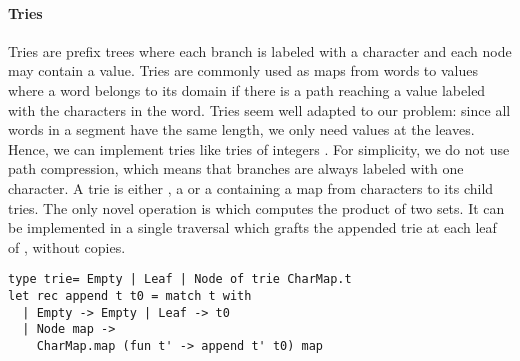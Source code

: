 \paragraph{Tries}

Tries \cite{Fredkin1960} are prefix trees where each branch is labeled
with a character and each node may contain a value. Tries are commonly used
as maps from words to values where a word belongs to its domain if there is a
path reaching a value labeled with the characters in the word.
Tries seem well adapted to our problem:
since all words in a segment have the same length, we only need values at the leaves.
%
Hence, we can implement tries like tries of integers \cite{Okasaki98fastmergeable}.
For simplicity, we do not use path compression, which means
that branches are always labeled with one character.
A trie is either , a  or a  containing a map from characters
to its child tries.
%
The only novel operation is  which computes the product of two sets.
It can be implemented in a single traversal which grafts the
appended trie  at each leaf of , without copies.
%
\begin{lstlisting}
type trie= Empty | Leaf | Node of trie CharMap.t
let rec append t t0 = match t with
  | Empty -> Empty | Leaf -> t0
  | Node map -> 
    CharMap.map (fun t' -> append t' t0) map
\end{lstlisting}

